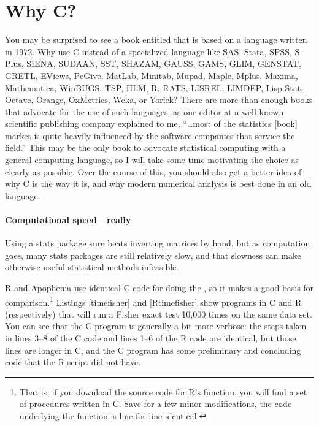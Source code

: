 \section{Why C?}
You may be surprised to see a book entitled  that is based on a language written in 1972. 
Why use C instead of a specialized language like SAS, Stata, SPSS,
S-Plus, SIENA, SUDAAN, SST, SHAZAM, GAUSS, GAMS, GLIM, GENSTAT, GRETL, EViews,
PcGive, MatLab, Minitab, Mupad, Maple, Mplus, Maxima, Mathematica, WinBUGS, TSP,
HLM, R, RATS, LISREL, LIMDEP, Lisp-Stat, Octave, Orange, OxMetrics, Weka, or Yorick?
There are more than enough books that advocate for the use of such
languages; as one editor at a well-known scientific publishing company
explained to me, ``\dots most of the statistics [book] market is quite
heavily influenced by the software companies that service the field.''
This may be the only book to advocate statistical computing with
a general computing language, so I will take some time motivating the
choice as clearly as possible. Over the course of this, you should also
get a better idea of why C is the way it is, and why modern numerical
analysis
is best done in an old language.

\paragraph{Computational speed---really} Using a stats package sure
beats inverting matrices by hand, but as computation goes, many stats
packages are still relatively slow, and that slowness can make otherwise
useful statistical methods infeasible.

\lstset{numbers=left, numberstyle=\scshape}

\lstset{numbers=none}

R and Apophenia use identical C code for doing the , so it makes a good basis for comparison.\footnote{That is,
if you download the source code for R's  function,
you will find a set of procedures written in C.  Save for a few minor
modifications, the code underlying the 
function is line-for-line identical.} Listings \ref{timefisher} and
\ref{Rtimefisher} show programs in C and R (respectively) that will run
a Fisher exact test 10,000 times on the same data set.  You can see that
the C program is generally a bit more verbose: the steps taken in lines
3--8 of the C code and lines 1--6 of the R code are identical, but those lines
are longer in C, and the C program has some preliminary and concluding
code that the R script did not have.

